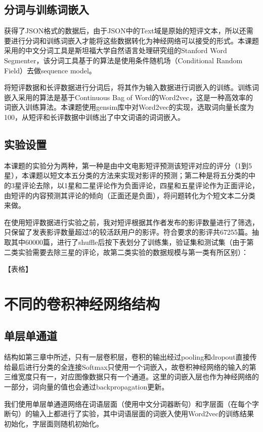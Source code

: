 \subsection{分词与训练词嵌入}
获得了JSON格式的数据后，由于JSON中的Text域是原始的短评文本，所以还需要进行分词和训练词嵌入才能将这些数据转化为神经网络可以接受的形式。本课题采用的中文分词工具是斯坦福大学自然语言处理研究组的Stanford Word Segmenter，该分词工具基于的算法是使用条件随机场（Conditional Random Field）去做sequence model。

将短评数据和长评数据进行分词后，将其作为输入数据进行词嵌入的训练。训练词嵌入采用的算法是基于Continuous Bag of Word的Word2vec，这是一种高效率的词嵌入训练算法。本课题使用gensim库中对Word2vec的实现，选取词向量长度为100，从短评和长评数据中训练出了中文词语的词词嵌入。

\subsection{实验设置}
本课题的实验分为两种，第一种是由中文电影短评预测该短评对应的评分（1到5星），本课题以短文本五分类的方法来实现对影评的预测；第二种是将五分类的中的3星评论去除，以1星和二星评论作为负面评论，四星和五星评论作为正面评论，由短评的内容预测其评论的倾向（正面还是负面），将问题转化为个短文本二分类来做。

在使用短评数据进行实验之前，我对短评根据其作者发布的影评数量进行了筛选，只保留了发表影评数量超过5的较活跃用户的影评。符合要求的影评共67255篇。抽取其中60000篇，进行了shuffle后按下表划分了训练集，验证集和测试集（由于第二类实验需要去除三星的评论，故第二类实验的数据规模与第一类有所区别）：

	【表格】


\section{不同的卷积神经网络结构}
\subsection{单层单通道}
结构如第三章中所述，只有一层卷积层，卷积的输出经过pooling和dropout直接传给最后进行分类的全连接Softmax只使用一个词嵌入，故卷积神经网络的输入的第三维宽度只有一，对应图像数据只有一个通道。这里的词嵌入层也作为神经网络的一部分，词向量的值也会通过backpropagation更新。

我们使用单层单通道网络在词语层面（使用中文分词器断句）和字层面（在每个字断句）的输入上都进行了实验，其中词语层面的词嵌入使用Word2vec的训练结果初始化，字层面则随机初始化。

